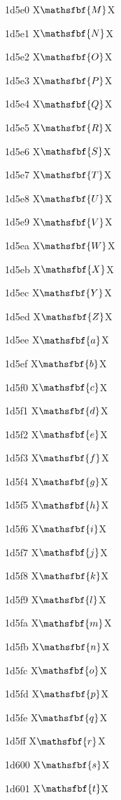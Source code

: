\documentclass[11pt]{article}
\begin{document}
1d5e0 X{\ensuremath{\mathsfbf{M}}}X

1d5e1 X{\ensuremath{\mathsfbf{N}}}X

1d5e2 X{\ensuremath{\mathsfbf{O}}}X

1d5e3 X{\ensuremath{\mathsfbf{P}}}X

1d5e4 X{\ensuremath{\mathsfbf{Q}}}X

1d5e5 X{\ensuremath{\mathsfbf{R}}}X

1d5e6 X{\ensuremath{\mathsfbf{S}}}X

1d5e7 X{\ensuremath{\mathsfbf{T}}}X

1d5e8 X{\ensuremath{\mathsfbf{U}}}X

1d5e9 X{\ensuremath{\mathsfbf{V}}}X

1d5ea X{\ensuremath{\mathsfbf{W}}}X

1d5eb X{\ensuremath{\mathsfbf{X}}}X

1d5ec X{\ensuremath{\mathsfbf{Y}}}X

1d5ed X{\ensuremath{\mathsfbf{Z}}}X

1d5ee X{\ensuremath{\mathsfbf{a}}}X

1d5ef X{\ensuremath{\mathsfbf{b}}}X

1d5f0 X{\ensuremath{\mathsfbf{c}}}X

1d5f1 X{\ensuremath{\mathsfbf{d}}}X

1d5f2 X{\ensuremath{\mathsfbf{e}}}X

1d5f3 X{\ensuremath{\mathsfbf{f}}}X

1d5f4 X{\ensuremath{\mathsfbf{g}}}X

1d5f5 X{\ensuremath{\mathsfbf{h}}}X

1d5f6 X{\ensuremath{\mathsfbf{i}}}X

1d5f7 X{\ensuremath{\mathsfbf{j}}}X

1d5f8 X{\ensuremath{\mathsfbf{k}}}X

1d5f9 X{\ensuremath{\mathsfbf{l}}}X

1d5fa X{\ensuremath{\mathsfbf{m}}}X

1d5fb X{\ensuremath{\mathsfbf{n}}}X

1d5fc X{\ensuremath{\mathsfbf{o}}}X

1d5fd X{\ensuremath{\mathsfbf{p}}}X

1d5fe X{\ensuremath{\mathsfbf{q}}}X

1d5ff X{\ensuremath{\mathsfbf{r}}}X

1d600 X{\ensuremath{\mathsfbf{s}}}X

1d601 X{\ensuremath{\mathsfbf{t}}}X
\end{document}

